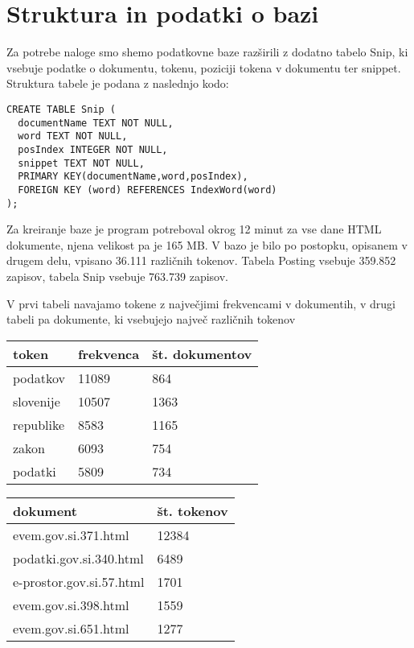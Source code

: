 \documentclass[conference]{IEEEtran}
\begin{document}
	\section{Struktura in podatki o bazi}
	
	Za potrebe naloge smo shemo podatkovne baze razširili z dodatno tabelo Snip, ki vsebuje podatke o dokumentu, tokenu, poziciji tokena v dokumentu ter snippet. Struktura tabele je podana z naslednjo kodo:

\begin{verbatim}
CREATE TABLE Snip (
  documentName TEXT NOT NULL,
  word TEXT NOT NULL,
  posIndex INTEGER NOT NULL,
  snippet TEXT NOT NULL,
  PRIMARY KEY(documentName,word,posIndex),
  FOREIGN KEY (word) REFERENCES IndexWord(word)
);
\end{verbatim}

		Za kreiranje baze je program potreboval okrog 12 minut za vse dane HTML dokumente, njena velikost pa je 165 MB. V bazo je bilo po postopku, opisanem v drugem delu, vpisano 36.111 različnih tokenov. Tabela Posting vsebuje 359.852 zapisov, tabela Snip vsebuje 763.739 zapisov.

	V prvi tabeli navajamo tokene z največjimi frekvencami v dokumentih, v drugi tabeli pa dokumente, ki vsebujejo največ različnih tokenov

\begin{flushleft}
\begin{tabular}{ |l|l|l| } 
 \hline
 token & frekvenca  & št. dokumentov    \\
 \hline
podatkov &  11089 & 864    \\ 
 \hline
 slovenije &  10507 &1363  \\  
 \hline
 republike &  8583 & 1165   \\
 \hline
 zakon & 6093 & 754   \\
 \hline
 podatki &  5809 & 734   \\
 \hline
\end{tabular}
\end{flushleft}


\begin{flushleft}
\begin{tabular}{ |l|l| } 
 \hline
 dokument & št. tokenov      \\
 \hline
evem.gov.si.371.html &  12384     \\ 
 \hline
 podatki.gov.si.340.html &  6489   \\  
 \hline
 e-prostor.gov.si.57.html &  1701   \\
 \hline
 evem.gov.si.398.html &  1559    \\
 \hline
 evem.gov.si.651.html &  1277   \\
 \hline
\end{tabular}
\end{flushleft}
\end{document}
